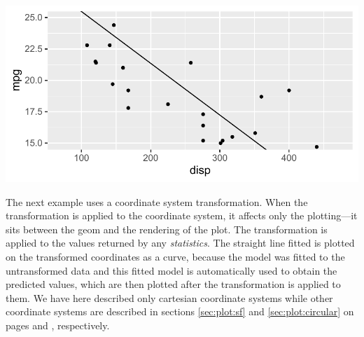 \documentclass[krantz2]{krantz}\usepackage{knitr}
\begin{document}
\begin{knitrout}\footnotesize
{}\color{fgcolor}\begin{kframe}
\begin{alltt}
\hlstd{(} 
       \hlstd{(}    \hlopt{+}
  \hlstd{()} \hlopt{+}
  \hlstd{(} \hlstd{=} \hlstd{,}  \hlstd{=} \hlstd{)} \hlopt{+}
  \hlstd{(} \hlstd{=} \hlstd{(}\hlstd{,} \hlstd{))}
\end{alltt}
\end{kframe}

{\centering \includegraphics[width=.7\textwidth]{figure/pos-ggplot-basics-07-1} 

}



\end{knitrout}

The next example uses a coordinate system transformation. When the transformation is applied to the coordinate system, it affects only the plotting---it sits between the geom and the rendering of the plot. The transformation is applied to the values returned by any \emph{statistics}. The straight line fitted is plotted on the transformed coordinates as a curve, because the model was fitted to the untransformed data and this fitted model is automatically used to obtain the predicted values, which are then plotted after the transformation is applied to them. We have here described only cartesian coordinate systems while other coordinate systems are described in sections \ref{sec:plot:sf} and \ref{sec:plot:circular} on pages \pageref{sec:plot:sf} and \pageref{sec:plot:circular}, respectively.
\end{document}
